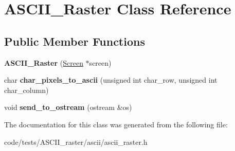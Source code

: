 \hypertarget{class_a_s_c_i_i___raster}{\section{A\-S\-C\-I\-I\-\_\-\-Raster Class Reference}
\label{class_a_s_c_i_i___raster}
}
\subsection*{Public Member Functions}
\begin{DoxyCompactItemize}
\item 
\hypertarget{class_a_s_c_i_i___raster_a8d8e68e072981837925d377dcba7896b}{{\bfseries A\-S\-C\-I\-I\-\_\-\-Raster} (\hyperlink{class_screen}{Screen} $\ast$screen)}\label{class_a_s_c_i_i___raster_a8d8e68e072981837925d377dcba7896b}

\item 
\hypertarget{class_a_s_c_i_i___raster_a9dbbcd71778969bd0489c11322a255ef}{char {\bfseries char\-\_\-pixels\-\_\-to\-\_\-ascii} (unsigned int char\-\_\-row, unsigned int char\-\_\-column)}\label{class_a_s_c_i_i___raster_a9dbbcd71778969bd0489c11322a255ef}

\item 
\hypertarget{class_a_s_c_i_i___raster_ab02c2623952459c8b401e6b77b7967b3}{void {\bfseries send\-\_\-to\-\_\-ostream} (ostream \&os)}\label{class_a_s_c_i_i___raster_ab02c2623952459c8b401e6b77b7967b3}

\end{DoxyCompactItemize}


The documentation for this class was generated from the following file\-:\begin{DoxyCompactItemize}
\item 
code/tests/\-A\-S\-C\-I\-I\-\_\-raster/ascii/ascii\-\_\-raster.\-h\end{DoxyCompactItemize}
